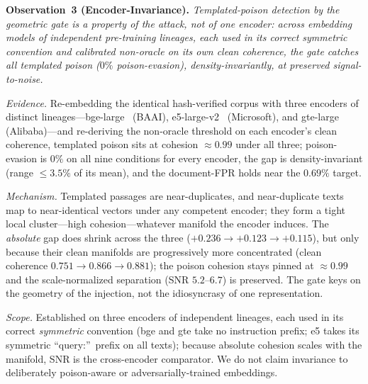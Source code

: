 \documentclass[10pt,journal,compsoc]{IEEEtran}
\begin{document}
\smallskip
\noindent\textbf{Observation~3 (Encoder-Invariance).}
\emph{Templated-poison detection by the geometric gate is a property of the attack,
not of one encoder: across embedding models of independent pre-training lineages, each
used in its correct symmetric convention and calibrated non-oracle on its own clean
coherence, the gate catches all templated poison ($0\%$ poison-evasion), density-invariantly, at
preserved signal-to-noise.}

\emph{Evidence.} Re-embedding the identical hash-verified corpus with three encoders of
distinct lineages---bge-large~\cite{bge} (BAAI), e5-large-v2~\cite{e5} (Microsoft), and
gte-large~\cite{gte} (Alibaba)---and re-deriving the non-oracle threshold on each
encoder's clean coherence, templated poison sits at cohesion $\approx 0.99$ under all
three; poison-evasion is $0\%$ on all nine conditions for every encoder, the gap is
density-invariant (range $\le 3.5\%$ of its mean), and the document-FPR holds near the
$0.69\%$ target.

\emph{Mechanism.} Templated passages are near-duplicates, and near-duplicate texts map
to near-identical vectors under any competent encoder; they form a tight local
cluster---high cohesion---whatever manifold the encoder induces. The \emph{absolute}
gap does shrink across the three ($+0.236 \to +0.123 \to +0.115$), but only because
their clean manifolds are progressively more concentrated (clean coherence
$0.751 \to 0.866 \to 0.881$); the poison cohesion stays pinned at $\approx 0.99$ and
the scale-normalized separation (SNR $5.2$--$6.7$) is preserved. The gate keys on the
geometry of the injection, not the idiosyncrasy of one representation.

\emph{Scope.} Established on three encoders of independent lineages, each used in its
correct \emph{symmetric} convention (bge and gte take no instruction prefix; e5 takes
its symmetric ``query:''\ prefix on all texts); because absolute cohesion scales with
the manifold, SNR is the cross-encoder comparator. We do not claim invariance to
deliberately poison-aware or adversarially-trained embeddings.
\end{document}
